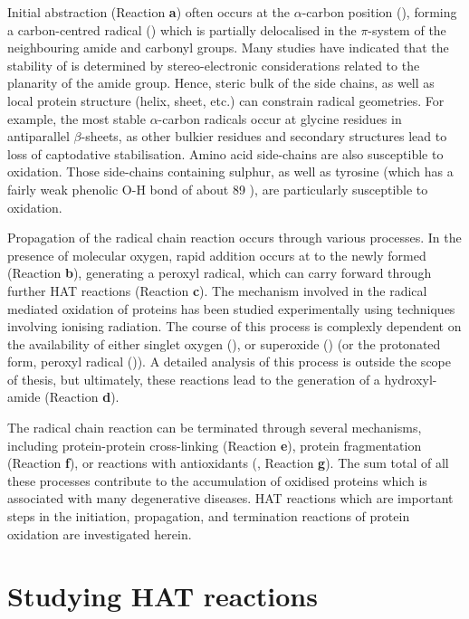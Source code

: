 Initial abstraction (Reaction \textbf{a}) often occurs at the $\alpha$-carbon position (), forming a carbon-centred radical () which is partially delocalised in the $\pi$-system of the neighbouring amide and carbonyl groups. Many studies have indicated that the stability of  is determined by stereo-electronic considerations related to the planarity of the amide group. Hence, steric bulk of the side chains, as well as local protein structure (helix, sheet, etc.) can constrain radical geometries. For example, the most stable $\alpha$-carbon radicals occur at glycine residues in antiparallel $\beta$-sheets, as other bulkier residues and secondary structures lead to loss of captodative stabilisation.\cite{Rauk2000} Amino acid side-chains are also susceptible to oxidation. Those side-chains containing sulphur,\cite{Stadtman2004} as well as tyrosine (which has a fairly weak phenolic O-H bond of about 89 \kcalmol),\cite{Mulder2005} are particularly susceptible to oxidation.

Propagation of the radical chain reaction occurs through various processes. In the presence of molecular oxygen, rapid addition occurs at to the newly formed  (Reaction \textbf{b}), generating a peroxyl radical, which can carry forward through further HAT reactions (Reaction \textbf{c}).\cite{Stadtman2003} The mechanism involved in the radical mediated oxidation of proteins has been studied experimentally using techniques involving ionising radiation.\cite{Garrison1962,Garrison1987} The course of this process is complexly dependent on the availability of either singlet oxygen (), or superoxide () (or the protonated form, peroxyl radical ()). A detailed analysis of this process is outside the scope of thesis, but ultimately, these reactions lead to the generation of a hydroxyl-amide (Reaction \textbf{d}).

The radical chain reaction can be terminated through several mechanisms, including protein-protein cross-linking (Reaction \textbf{e}), protein fragmentation (Reaction \textbf{f}), or reactions with antioxidants (, Reaction \textbf{g}). The sum total of all these processes contribute to the accumulation of oxidised proteins which is associated with many degenerative diseases.\cite{Halliwell2006} HAT reactions which are important steps in the initiation, propagation, and termination reactions of protein oxidation are investigated herein.

\section{Studying HAT reactions}

